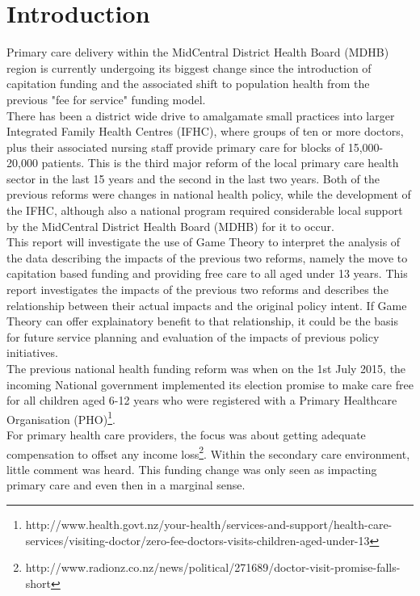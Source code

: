 \documentclass[11pt,a4paper]{article}
\begin{document}
\tableofcontents

\pagebreak
\pagebreak

\listoffigures

\pagebreak
\section{Introduction}
Primary care delivery within the MidCentral District Health Board (MDHB) region is currently undergoing its biggest change since the introduction of capitation funding and the associated shift to population health from the previous "fee for service" funding model.\\

There has been a district wide drive to amalgamate small practices into larger Integrated Family Health Centres (IFHC), where groups of ten or more doctors, plus their associated nursing staff provide primary care for blocks of  15,000-20,000 patients. This is the third major reform of the local primary care health sector in the last 15 years and the second in the last two years. Both of the previous reforms were changes in national health policy, while the development of the IFHC, although also a national program required considerable local support by the MidCentral District Health Board (MDHB) for it to occur. \\

This report will investigate the use of Game Theory to interpret the analysis of the data describing the impacts of the previous two reforms, namely the move to capitation based funding and providing free care to all aged under 13 years. This report investigates the impacts of the previous two reforms and describes the relationship between their actual impacts and the original policy intent. If Game Theory can offer explainatory benefit to that relationship, it could be the basis for future service planning and evaluation of the impacts of previous policy initiatives.\\ 

The previous national health funding reform was when on the 1st July 2015, the incoming National government implemented its election promise to make care free for all children aged 6-12 years who were registered with a Primary Healthcare Organisation (PHO)\footnote{http://www.health.govt.nz/your-health/services-and-support/health-care-services/visiting-doctor/zero-fee-doctors-visits-children-aged-under-13}.\\

For primary health care providers, the focus was about getting adequate compensation to offset any income loss\footnote{http://www.radionz.co.nz/news/political/271689/doctor-visit-promise-falls-short}. Within the secondary care environment, little comment was heard. This funding change was only seen as impacting primary care and even then in a marginal sense.\\
\end{document}
